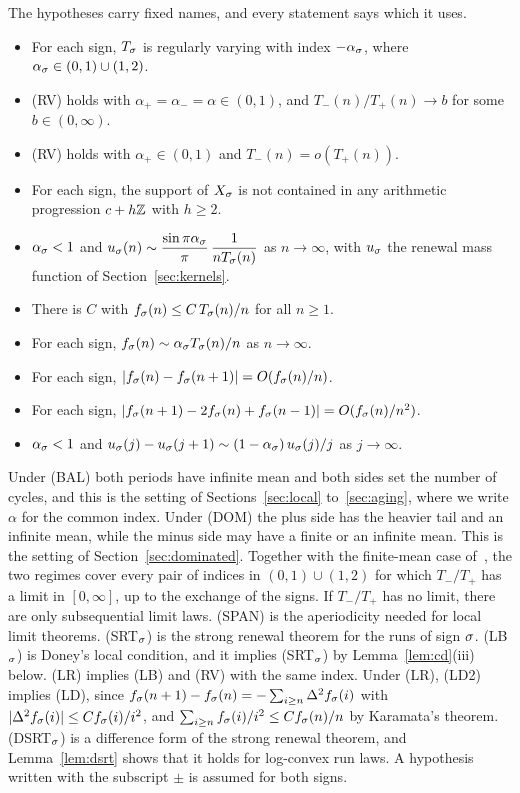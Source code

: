 The hypotheses carry fixed names, and every statement says which it uses.
\begin{itemize}[leftmargin=5em,labelsep=0.8em]
\item[(RV)] For each sign, $T_\sigma$ is regularly varying with index $-\alpha_\sigma$, where
$\alpha_\sigma\in(0,1)\cup(1,2)$.
\item[(BAL)] (RV) holds with $\alpha_\plus=\alpha_\minus=\alpha\in(0,1)$, and
$T_\minus(n)/T_\plus(n)\to b$ for some $b\in(0,\infty)$.
\item[(DOM)] (RV) holds with $\alpha_\plus\in(0,1)$ and $T_\minus(n)=o(T_\plus(n))$.
\item[(SPAN)] For each sign, the support of $X_\sigma$ is not contained in any
arithmetic progression $c+h\mathbb{Z}$ with $h\ge2$.
\item[(SRT$_\sgn$)] $\alpha_\sigma<1$ and $u_\sigma(n)\sim\dfrac{\sin\pi\alpha_\sigma}{\pi}\,\dfrac1{nT_\sigma(n)}$ as
$n\to\infty$, with $u_\sigma$ the renewal mass function of Section~\ref{sec:kernels}.
\item[(LB$_\sgn$)] There is $C$ with $f_\sigma(n)\le C\,T_\sigma(n)/n$ for all $n\ge1$.
\item[(LR)] For each sign, $f_\sigma(n)\sim\alpha_\sigma T_\sigma(n)/n$ as $n\to\infty$.
\item[(LD)] For each sign, $|f_\sigma(n)-f_\sigma(n+1)|=O(f_\sigma(n)/n)$.
\item[(LD2)] For each sign, $|f_\sigma(n+1)-2f_\sigma(n)+f_\sigma(n-1)|=O(f_\sigma(n)/n^2)$.
\item[(DSRT$_\sgn$)] $\alpha_\sigma<1$ and $u_\sigma(j)-u_\sigma(j+1)\sim(1-\alpha_\sigma)\,u_\sigma(j)/j$ as $j\to\infty$.
\end{itemize}
Under (BAL) both periods have infinite mean and both sides set the number of cycles,
and this is the setting of Sections~\ref{sec:local} to~\ref{sec:aging}, where we write
$\alpha$ for the common index. Under (DOM) the plus side has the heavier tail and an
infinite mean, while the minus side may have a finite or an infinite mean. This is the
setting of Section~\ref{sec:dominated}. Together with the finite-mean case
of~\cite{paperF}, the two regimes cover every pair of indices in $(0,1)\cup(1,2)$ for
which $T_\minus/T_\plus$ has a limit in $[0,\infty]$, up to the exchange of the signs. If
$T_\minus/T_\plus$ has no limit, there are only subsequential limit laws. (SPAN) is the
aperiodicity needed for local limit theorems. (SRT$_\sgn$) is the strong renewal theorem
for the runs of sign $\sigma$. (LB$_\sgn$) is Doney's local condition, and it implies
(SRT$_\sgn$) by Lemma~\ref{lem:cd}(iii) below. (LR) implies (LB) and (RV) with the same
index. Under (LR), (LD2) implies (LD), since $f_\sigma(n+1)-f_\sigma(n)=-\sum_{i\ge n}\Delta^2f_\sigma(i)$ with
$|\Delta^2f_\sigma(i)|\le Cf_\sigma(i)/i^2$, and $\sum_{i\ge n}f_\sigma(i)/i^2\le Cf_\sigma(n)/n$ by Karamata's
theorem. (DSRT$_\sgn$) is a difference form of the strong renewal theorem, and
Lemma~\ref{lem:dsrt} shows that it holds for log-convex run laws. A hypothesis written
with the subscript $\pm$ is assumed for both signs.

